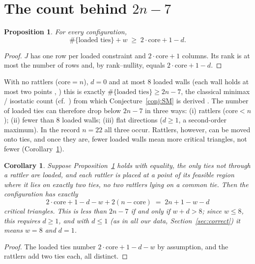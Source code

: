 \documentclass[11pt]{amsart}
\newtheorem{proposition}[theorem]{Proposition}
\newtheorem{corollary}[theorem]{Corollary}
\theoremstyle{definition}
\newcommand{\core}{\mathrm{core}}
\begin{document}
\section{The count behind \texorpdfstring{$2n-7$}{2n-7}}\label{sec:count}

\begin{proposition}\label{prop:count}
For every configuration,
\[
  \#\{\text{loaded ties}\} + w \;\ge\; 2\cdot\core + 1 - d .
\]
\end{proposition}

\begin{proof}
$J$ has one row per loaded constraint and $2\cdot\core+1$ columns. Its rank is at most the number of rows and, by rank--nullity, equals $2\cdot\core + 1 - d$.
\end{proof}

With no rattlers ($\core = n$), $d = 0$ and at most 8 loaded walls (each wall holds at most two points \cite[Lemma~4]{SM}, \cite[proof of Thm.~4.3]{Trela}) this is exactly $\#\{\text{loaded ties}\} \ge 2n-7$, the classical minimax / isostatic count (cf.\ \cite{CGSY}) from which Conjecture~\ref{conj:SM} is derived \cite[Sec.~7.1]{SM}. %
The number of loaded ties can therefore drop below $2n-7$ in three ways: (i) rattlers ($\core < n$); (ii) fewer than 8 loaded walls; (iii) flat directions ($d \ge 1$, a second-order maximum). In the record $n = 22$ all three occur. Rattlers, however, can be moved onto ties, and once they are, fewer loaded walls mean more critical triangles, not fewer (Corollary~\ref{cor:repair}).

\begin{corollary}\label{cor:repair}
Suppose Proposition~\ref{prop:count} holds with equality, the only ties not through a rattler are loaded, and each rattler is placed at a point of its feasible region where it lies on exactly two ties, no two rattlers lying on a common tie. Then the configuration has exactly
\[
  2\cdot\core + 1 - d - w + 2(n - \core) \;=\; 2n + 1 - w - d
\]
critical triangles. This is less than $2n - 7$ if and only if $w + d > 8$; since $w \le 8$, this requires $d \ge 1$, and with $d \le 1$ (as in all our data, Section~\ref{sec:correct}) it means $w = 8$ and $d = 1$.
\end{corollary}

\begin{proof}
The loaded ties number $2\cdot\core + 1 - d - w$ by assumption, and the rattlers add two ties each, all distinct.
\end{proof}
\end{document}
